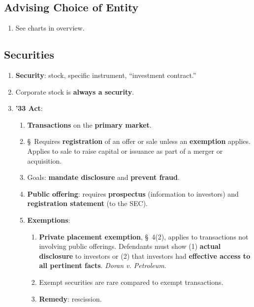\newpage

\subsection{Advising Choice of Entity}

\begin{enumerate}
    \item See charts in overview.
\end{enumerate}

\newpage

\subsection{Securities}

\begin{enumerate}
    \item \textbf{Security}: stock, specific instrument, ``investment 
    contract.''
    \item Corporate stock is \textbf{always a security}.
    \item \textbf{'33 Act}:
    \begin{enumerate}
        \item \textbf{Transactions} on the \textbf{primary market}.
        \item \S\ Requires \textbf{registration} of an offer or sale unless an 
        \textbf{exemption} applies. Applies to sale to raise capital or 
        issuance as part of a merger or acquisition.
        \item Goals: \textbf{mandate disclosure} and \textbf{prevent fraud}.
        \item \textbf{Public offering}: requires \textbf{prospectus} 
        (information to investors) and \textbf{registration statement} (to the 
        SEC).
        \item \textbf{Exemptions}:
        \begin{enumerate}
            \item \textbf{Private placement exemption}, \S\ 4(2), applies to 
            transactions not involving public offerings. Defendants must show 
            (1) \textbf{actual disclosure} to investors or (2) that investors 
            had \textbf{effective access to all pertinent facts}. \emph{Doran 
            v. Petroleum}.
            \item Exempt securities are rare compared to exempt transactions.
            \item \textbf{Remedy}: rescission.

\end{enumerate}
\end{enumerate}
\end{enumerate}
